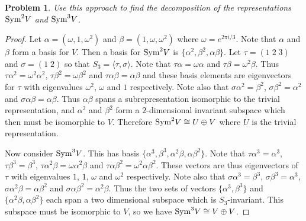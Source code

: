\documentclass{article}
\newtheorem{problem}{Problem}
\newcommand{\sym}{\textup{Sym}}
\begin{document}
\begin{problem}
Use this approach to find the decomposition of the representations $\sym^2 V$ and $\sym^3 V$.
\end{problem}
\begin{proof}
Let $\alpha = (\omega, 1, \omega^2)$ and $\beta = (1, \omega, \omega^2)$ where $\omega = e^{2 \pi i/3}$. Note that $\alpha$ and $\beta$ form a basis for $V$. Then a basis for $\sym^2 V$ is $\{\alpha^2, \beta^2, \alpha \beta\}$. Let $\tau = (1 \; 2 \; 3)$ and $\sigma = (1 \; 2)$ so that $S_3 = \langle \tau, \sigma \rangle$. Note that $\tau \alpha = \omega \alpha$ and $\tau \beta = \omega^2 \beta$. Thus $\tau \alpha^2 = \omega^2 \alpha^2$, $\tau \beta^2 = \omega \beta^2$ and $\tau \alpha \beta = \alpha \beta$ and these basis elements are eigenvectors for $\tau$ with eigenvalues $\omega^2$, $\omega$ and $1$ respectively. Note also that $\sigma \alpha^2 = \beta^2$, $\sigma \beta^2 = \alpha^2$ and $\sigma \alpha \beta = \alpha \beta$. Thus $\alpha \beta$ spans a subrepresentation isomorphic to the trivial representation, and $\alpha^2$ and $\beta^2$ form a $2$-dimensional invariant subspace which then must be isomorphic to $V$. Therefore $\sym^2 V \cong U \oplus V$ where $U$ is the trivial representation.

Now consider $\sym^3 V$. This has basis $\{\alpha^3, \beta^3, \alpha^2 \beta, \alpha \beta^2 \}$. Note that $\tau \alpha^3 = \alpha^3$, $\tau \beta^3 = \beta^3$, $\tau \alpha^2 \beta = \omega \alpha^2 \beta$ and $\tau \alpha \beta^2 = \omega^2 \alpha \beta^2$. These vectors are thus eigenvectors of $\tau$ with eigenvalues $1$, $1$, $\omega$ and $\omega^2$ respectively. Note also that $\sigma \alpha^3 = \beta^3$, $\sigma \beta^3 = \alpha^3$, $\sigma \alpha^2 \beta = \alpha \beta^2$ and $\sigma \alpha \beta^2 = \alpha^2 \beta$. Thus the two sets of vectors $\{\alpha^3, \beta^3\}$ and $\{\alpha^2 \beta, \alpha \beta^2\}$ each span a two dimensional subspace which is $S_3$-invariant. This subspace must be isomorphic to $V$, so we have $\sym^3 V \cong V \oplus V$.
\end{proof}
\end{document}
